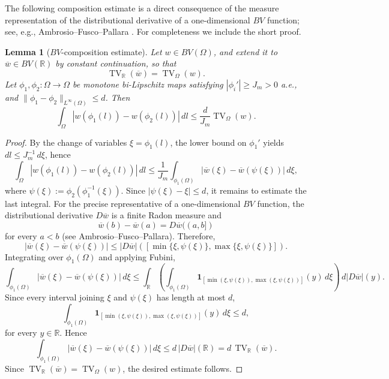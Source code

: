 \documentclass[a4paper,fleqn,longmktitle]{cas-sc}
\theoremstyle{plain}
\newtheorem{lemma}[theorem]{Lemma}
\theoremstyle{definition}
\theoremstyle{remark}
\numberwithin{equation}{section}
\begin{document}
The following composition estimate is a direct consequence of the
measure representation of the distributional derivative of a
one-dimensional \(BV\) function; see, e.g.,
Ambrosio--Fusco--Pallara
\cite{ambrosio2000functions}.
For completeness we include the short proof.
\begin{lemma}[\(BV\)-composition estimate]
\label{lem:app_bv_composition}
Let \(w\in BV(\Omega)\), and extend it to
\(\overline w\in BV(\mathbb R)\) by constant continuation,
so that
\[
\operatorname{TV}_{\mathbb R}(\overline w)
=
\operatorname{TV}_{\Omega}(w).
\]
Let
\(\phi_1,\phi_2:\Omega\to\Omega\)
be monotone bi-Lipschitz maps satisfying
$|\phi_i'|\ge J_m>0$ a.e., and
$\|\phi_1-\phi_2\|_{L^\infty(\Omega)}
\le d$.
Then
\[
\int_\Omega
|w(\phi_1(l))-w(\phi_2(l))|
\,dl
\le
\frac{d}{J_m}
\operatorname{TV}_\Omega(w).
\]
\end{lemma}

\begin{proof}
By the change of variables
\(\xi=\phi_1(l)\),
the lower bound on \(\phi_1'\) yields
$dl \le J_m^{-1}\,d\xi$,
hence
\[
\int_\Omega
|w(\phi_1(l))-w(\phi_2(l))|
\,dl
\le
\frac1{J_m}
\int_{\phi_1(\Omega)}
|\overline w(\xi)-\overline w(\psi(\xi))|
\,d\xi,
\]
where $\psi(\xi) := \phi_2(\phi_1^{-1}(\xi))$.
Since $|\psi(\xi)-\xi| \le d$,
it remains to estimate the last integral.
For the precise representative of a one-dimensional
\(BV\) function,
the distributional derivative
\(D\overline w\)
is a finite Radon measure and
\[
\overline w(b)-\overline w(a)
=
D\overline w((a,b])
\]
for every \(a<b\)
(see Ambrosio--Fusco--Pallara).
Therefore,
\[
|\overline w(\xi)-\overline w(\psi(\xi))|
\le
|D\overline w|
\!\left(
[\min\{\xi,\psi(\xi)\},
\max\{\xi,\psi(\xi)\}]
\right).
\]
Integrating over \(\phi_1(\Omega)\) and applying Fubini,
\[
\int_{\phi_1(\Omega)}
|\overline w(\xi)-\overline w(\psi(\xi))|
\,d\xi \le
\int_{\mathbb R}
\left(
\int_{\phi_1(\Omega)}
\mathbf 1_{
[\min(\xi,\psi(\xi)),
\max(\xi,\psi(\xi))]
}(y)
\,d\xi
\right)
\,d|D\overline w|(y).
\]
Since every interval
joining
\(\xi\)
and
\(\psi(\xi)\)
has length at most \(d\),
\[
\int_{\phi_1(\Omega)}
\mathbf 1_{
[\min(\xi,\psi(\xi)),
\max(\xi,\psi(\xi))]
}(y)
\,d\xi
\le
d,
\]
for every \(y\in\mathbb R\).
Hence
\[
\int_{\phi_1(\Omega)}
|\overline w(\xi)-\overline w(\psi(\xi))|
\,d\xi
\le
d\,|D\overline w|(\mathbb R)
=
d\,\operatorname{TV}_{\mathbb R}(\overline w).
\]
Since $\operatorname{TV}_{\mathbb R}(\overline w)
=
\operatorname{TV}_\Omega(w)$, the desired estimate follows.
\end{proof}
\end{document}

